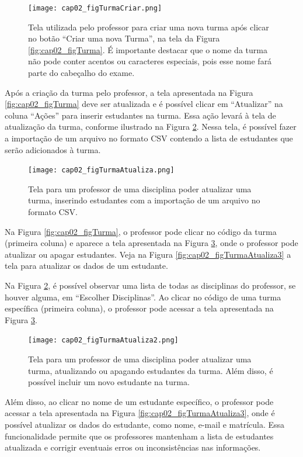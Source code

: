 \begin{figure}[!ht]
  \centering
  \texttt{[image: cap02\_figTurmaCriar.png]}
  \caption{Tela utilizada pelo professor para criar uma nova turma após clicar no botão ``Criar uma nova Turma'', na tela da Figura \ref{fig:cap02_figTurma}. É importante destacar que o nome da turma não pode conter acentos ou caracteres especiais, pois esse nome fará parte do cabeçalho do exame.}
  \label{fig:cap02_figTurmaCriar}
\end{figure}

Após a criação da turma pelo professor, a tela apresentada na Figura \ref{fig:cap02_figTurma} deve ser atualizada e é possível clicar em ``Atualizar'' na coluna ``Ações'' para inserir estudantes na turma. Essa ação levará à tela de atualização da turma, conforme ilustrado na Figura \ref{fig:cap02_figTurmaAtualiza}. Nessa tela, é possível fazer a importação de um arquivo no formato CSV contendo a lista de estudantes que serão adicionados à turma.

\begin{figure}[!ht]
  \centering
  \texttt{[image: cap02\_figTurmaAtualiza.png]}
  \caption{Tela para um professor de uma disciplina poder atualizar uma turma, inserindo estudantes com a importação de um arquivo no formato CSV.}
  \label{fig:cap02_figTurmaAtualiza}
\end{figure}

Na Figura \ref{fig:cap02_figTurma}, o professor pode clicar no código da turma (primeira coluna) e aparece a tela apresentada na Figura \ref{fig:cap02_figTurmaAtualiza2}, onde o professor pode atualizar ou apagar estudantes. Veja na Figura \ref{fig:cap02_figTurmaAtualiza3} a tela para atualizar os dados de um estudante.

Na Figura \ref{fig:cap02_figTurmaAtualiza}, é possível observar uma lista de todas as disciplinas do professor, se houver alguma, em ``Escolher Disciplinas''. Ao clicar no código de uma turma específica (primeira coluna), o professor pode acessar a tela apresentada na Figura \ref{fig:cap02_figTurmaAtualiza2}.


\begin{figure}[!ht]
  \centering
  \texttt{[image: cap02\_figTurmaAtualiza2.png]}
  \caption{Tela para um professor de uma disciplina poder atualizar uma turma, atualizando ou apagando estudantes da turma. Além disso, é possível incluir um novo estudante na turma.}
  \label{fig:cap02_figTurmaAtualiza2}
\end{figure}

Além disso, ao clicar no nome de um estudante específico, o professor pode acessar a tela apresentada na Figura \ref{fig:cap02_figTurmaAtualiza3}, onde é possível atualizar os dados do estudante, como nome, e-mail e matrícula. Essa funcionalidade permite que os professores mantenham a lista de estudantes atualizada e corrigir eventuais erros ou inconsistências nas informações.

